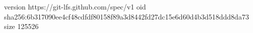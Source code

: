 version https://git-lfs.github.com/spec/v1
oid sha256:6b317090ee4cf48cdfdf80158f89a3d8442fd27dc15e6d60d4b3d518ddd8da73
size 125526
